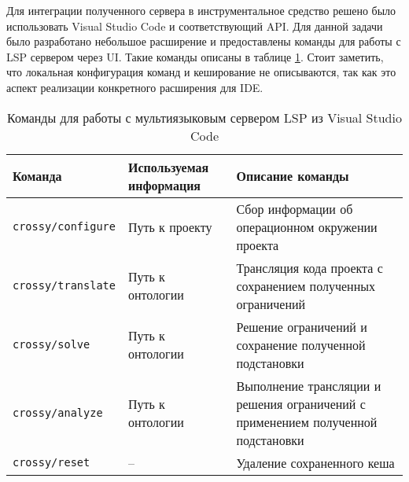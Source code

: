 Для интеграции полученного сервера в инструментальное средство решено было использовать Visual Studio Code и соответствующий
API. Для данной задачи было разработано небольшое расширение и предоставлены команды для работы с LSP сервером
через UI. Такие команды описаны в таблице \ref{lsp-methods}. Стоит заметить, что локальная конфигурация команд и кеширование
не описываются, так как это аспект реализации конкретного расширения для IDE.

\begin{table}[H]
    \caption{Команды для работы с мультиязыковым сервером LSP из Visual Studio Code}
    \begin{tabular}{|p{4cm}|p{4cm}|p{7cm}|}
    \hline Команда & Используемая информация & Описание команды \\ 
    \hline \texttt{crossy/configure} & Путь к проекту & Сбор информации об операционном окружении проекта \\
    \hline \texttt{crossy/translate} & Путь к онтологии & Трансляция кода проекта с сохранением полученных ограничений \\
    \hline \texttt{crossy/solve} & Путь к онтологии & Решение ограничений и сохранение полученной подстановки \\
    \hline \texttt{crossy/analyze} & Путь к онтологии & Выполнение трансляции и решения ограничений с применением полученной подстановки \\
    \hline \texttt{crossy/reset} & -- & Удаление сохраненного кеша \\
    \hline
    \end{tabular}\label{lsp-methods}
\end{table}